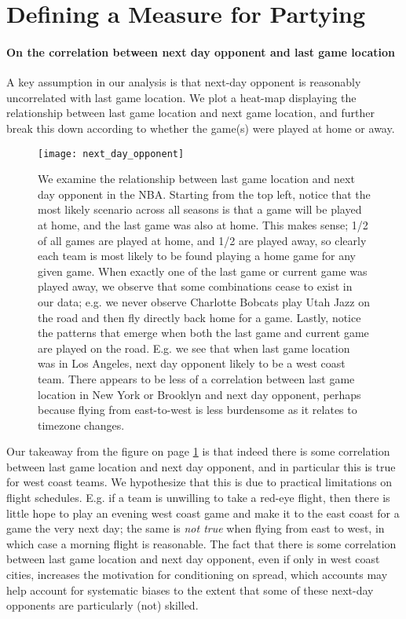 \documentclass[letterpaper,12pt]{article}
\begin{document}
\section{Defining a Measure for Partying}

\paragraph{On the correlation between next day opponent and last game location}
A key assumption in our analysis is that next-day opponent is reasonably uncorrelated with
last game location. We plot a heat-map displaying the relationship between last game location
and next game location, and further break this down according to whether the game(s)
were played at home or away.

\begin{figure}
  \centering
  \label{fig: next day opponent}
  \texttt{[image: next\_day\_opponent]}
  \caption{We examine the relationship between last game location and next day opponent in the NBA. Starting from the top left, notice that the most likely scenario across all seasons is that a game will be played at home, and the last game was also at home. This makes sense; 1/2 of all games are played at home, and 1/2 are played away, so clearly each team is most likely to be found playing a home game for any given game. When exactly one of the last game or current game was played away,
we observe that some combinations cease to exist in our data; e.g. we never observe Charlotte Bobcats play Utah Jazz on the road and then fly directly back home for a game. Lastly, notice the patterns that emerge when both the last game and current game are played on the road. E.g. we see that when last game location was in Los Angeles, next day opponent likely to be a west coast team. There appears to be less of a correlation between last game location in New York or Brooklyn and next day opponent, perhaps because flying from east-to-west
is less burdensome as it relates to timezone changes.} 
\end{figure}

Our takeaway from the figure on page \ref{fig: next day opponent} is that indeed there is some correlation between last game location
and next day opponent, and in particular this is true for west coast teams. We hypothesize that
this is due to practical limitations on flight schedules. E.g. if a team is unwilling to take a red-eye
flight, then there is little hope to play an evening west coast game and make it to the east coast for a game the very next day;
the same is \emph{not true} when flying from east to west, in which case a morning flight is reasonable.
The fact that there is some correlation between last game location and next day opponent, even if only in west coast cities, increases the motivation for conditioning on spread, which accounts may help account for systematic biases to the extent that some of these next-day opponents are particularly (not) skilled. 
\end{document}
